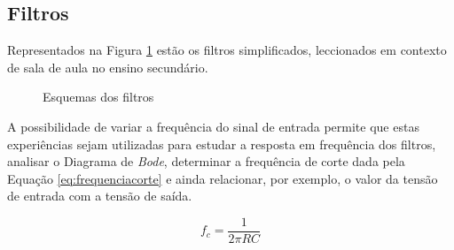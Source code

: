 \subsection{Filtros}
Representados na Figura \ref{fig:filtrosesqgeral} estão os filtros simplificados, leccionados em contexto de sala de aula no ensino secundário.

\begin{figure}[hbtp]
	\centering%
		\centering
		\qquad
		\caption{Esquemas dos filtros \cite{sedrasmith}}%
		\label{fig:filtrosesqgeral}%
\end{figure}

A possibilidade de variar a frequência do sinal de entrada permite que estas experiências sejam utilizadas para estudar a resposta em frequência dos filtros, analisar o Diagrama de \textit{Bode}, determinar a frequência de corte dada pela Equação \ref{eq:frequenciacorte} e ainda relacionar, por exemplo, o valor da tensão de entrada com a tensão de saída. 

\begin{equation} \label{eq:frequenciacorte}
	f_{c} = \frac{1}{2\pi RC}
\end{equation}

